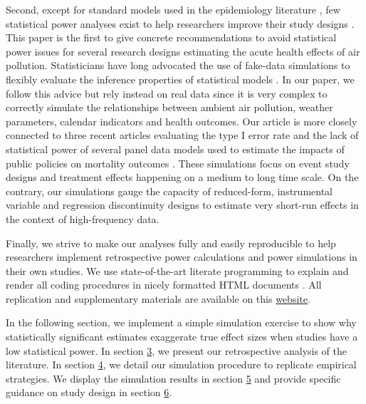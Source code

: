 \documentclass[12pt]{article}
\begin{document}
    Second, except for standard models used in the epidemiology literature \citep{winquist2012power}, few statistical power analyses exist to help researchers improve their study designs \citep{bhaskaran2013time}. This paper is the first to give concrete recommendations to avoid statistical power issues for several research designs estimating the acute health effects of air pollution. Statisticians have long advocated the use of fake-data simulations to flexibly evaluate the inference properties of statistical models \citep{gelman_beyond_2014, vasishth2019embrace, altoe_enhancing_2020, gelman2020regression}. In our paper, we follow this advice but rely instead on real data since it is very complex to correctly simulate the relationships between ambient air pollution, weather parameters, calendar indicators and health outcomes. Our article is more closely connected to three recent articles evaluating the type I error rate and the lack of statistical power of several panel data models used to estimate the impacts of public policies on mortality outcomes \citep{schell2018evaluating, black2019simulated, griffin2020variation}. These simulations focus on event study designs and treatment effects happening on a medium to long time scale. On the contrary, our simulations gauge the capacity of reduced-form, instrumental variable and regression discontinuity designs to estimate very short-run effects in the context of high-frequency data.
    
    Finally, we strive to make our analyses fully and easily reproducible to help researchers implement retrospective power calculations and power simulations in their own studies. We use state-of-the-art literate programming to explain and render all coding procedures in nicely formatted HTML documents \citep{allaire2018distill}. All replication and supplementary materials are available on this \href{https://vincentbagilet.github.io/inference_pollution/}{website}.
     
    In the following section, we implement a simple simulation exercise to show why statistically significant estimates exaggerate true effect sizes when studies have a low statistical power. In section \hyperlink{section.3}{3}, we present our retrospective analysis of the literature. In section \hyperlink{section.4}{4}, we detail our simulation procedure to replicate empirical strategies. We display the simulation results in section \hyperlink{section.5}{5} and provide specific guidance on study design in section \hyperlink{section.6}{6}.
    
\end{document}
